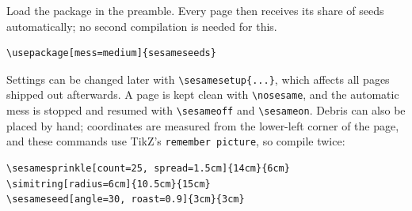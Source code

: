 \documentclass[11pt,a4paper]{article}
\begin{document}
Load the package in the preamble. Every page then receives its share of
seeds automatically; no second compilation is needed for this.
\begin{verbatim}
\usepackage[mess=medium]{sesameseeds}
\end{verbatim}
Settings can be changed later with \verb|\sesamesetup{...}|, which affects all
pages shipped out afterwards. A page is kept clean with \verb|\nosesame|, and the
automatic mess is stopped and resumed with \verb|\sesameoff| and
\verb|\sesameon|. Debris can also be placed by hand; coordinates are measured
from the lower-left corner of the page, and these commands use TikZ's
\texttt{remember picture}, so compile twice:
\begin{verbatim}
\sesamesprinkle[count=25, spread=1.5cm]{14cm}{6cm}
\simitring[radius=6cm]{10.5cm}{15cm}
\sesameseed[angle=30, roast=0.9]{3cm}{3cm}
\end{verbatim}
\end{document}
